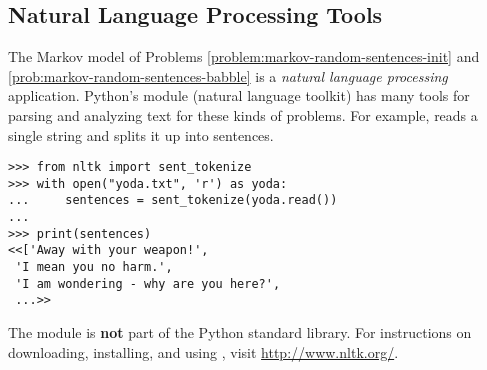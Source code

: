 \subsection*{Natural Language Processing Tools} %

The Markov model of Problems \ref{problem:markov-random-sentences-init} and \ref{prob:markov-random-sentences-babble} is a \emph{natural language processing} application.
Python's  module (natural language toolkit) has many tools for parsing and analyzing text for these kinds of problems.
For example,  reads a single string and splits it up into sentences.

\begin{lstlisting}
>>> from nltk import sent_tokenize
>>> with open("yoda.txt", 'r') as yoda:
...     sentences = sent_tokenize(yoda.read())
...
>>> print(sentences)
<<['Away with your weapon!',
 'I mean you no harm.',
 'I am wondering - why are you here?',
 ...>>
\end{lstlisting}

The  module is \textbf{not} part of the Python standard library.
For instructions on downloading, installing, and using , visit \url{http://www.nltk.org/}.
